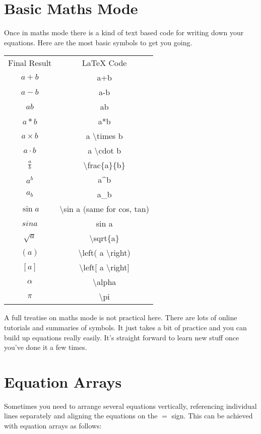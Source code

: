 \section{Basic Maths Mode}
Once in maths mode there is a kind of text based code for writing down your equations.  Here are the most basic symbols to get you going.
\begin{center}
\begin{tabular}{cc}
\toprule
Final Result & LaTeX Code \\
\cmidrule(){1-2}
$a+b$ & a+b \\
$a-b$ & a-b \\
$ab$ & ab \\
$a*b$ & a*b \\
$a \times b$ & a {\textbackslash}times b \\
$a \cdot b$ & a {\textbackslash}cdot b \\
$\frac{a}{b}$ & {\textbackslash}frac\{a\}\{b\} \\ 
$a^b$ & a\textasciicircum{}b \\
$a_b$ & a\_b \\
$\sin a$ & {\textbackslash}sin a  (same for cos, tan)\\
$ sin a$ & sin a \\
$\sqrt{a}$ & {\textbackslash}sqrt\{a\} \\
$\left( a \right) $ & {\textbackslash}left( a {\textbackslash}right)\\ 
$\left[ a \right]$ & {\textbackslash}left[ a {\textbackslash}right]\\ 
$\alpha$ & {\textbackslash}alpha \\
$\pi$ & {\textbackslash}pi \\
\bottomrule
\end{tabular}
\end{center}

A full treatise on maths mode is not practical here. There are lots of online tutorials and summaries of symbols. It just takes a bit of practice and you can build up equations really easily. It's straight forward to learn new stuff once you've done it a few times.

\pagebreak
\section{Equation Arrays}
Sometimes you need to arrange several equations vertically, referencing individual lines separately and aligning the equations on the $=$ sign. This can be achieved with equation arrays as follows:

